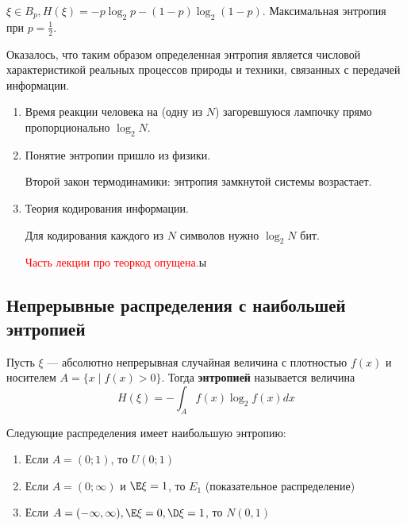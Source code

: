 \begin{example}
    \(\xi \in B_p, H(\xi) = - p \log_2 p - (1 - p) \log_2(1 - p)\). Максимальная энтропия при \(p = \frac{1}{2}\).
\end{example}

Оказалось, что таким образом определенная энтропия является числовой характеристикой реальных процессов природы и техники, связанных с передачей информации.

\begin{example}\itemfix
    \begin{enumerate}
        \item Время реакции человека на (одну из \(N\)) загоревшуюся лампочку прямо пропорционально \(\log_2 N\).
        \item Понятие энтропии пришло из физики.

              Второй закон термодинамики: энтропия замкнутой системы возрастает.

        \item Теория кодирования информации.

              Для кодирования каждого из \(N\) символов нужно \(\log_2 N\) бит.

              \textcolor{red}{Часть лекции про теоркод опущена.}ы
    \end{enumerate}
\end{example}

\subsection{Непрерывные распределения с наибольшей энтропией}

\begin{definition}
    Пусть \(\xi\) --- абсолютно непрерывная случайная величина с плотностью \(f(x)\) и носителем \(A = \{x \mid f(x) > 0\}\). Тогда \textbf{энтропией} называется величина
    \[H(\xi) = - \int_A f(x) \log_2 f(x) dx\]
\end{definition}

Следующие распределения имеет наибольшую энтропию:
\begin{enumerate}
    \item Если \(A = (0; 1)\), то \(U(0; 1)\)
    \item Если \(A = (0; \infty)\) и \(\E \xi = 1\), то \(E_1\) (показательное распределение)
    \item Если \(A = ( - \infty, \infty), \E \xi = 0, \D \xi = 1\), то \(N(0, 1)\)
\end{enumerate}

